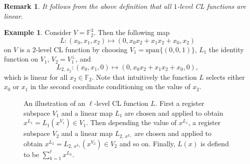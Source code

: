 \documentclass[11pt]{article}
\newtheorem{remark}[theorem]{Remark}
\theoremstyle{definition}
\newtheorem{example}[theorem]{Example}
\newcommand{\F}{\ensuremath{\mathbb{F}}}
\begin{document}
\begin{remark}
  \label{rk:level-1-is-linear}
  It follows from the above definition that all $1$-level CL functions are linear.
\end{remark}

\begin{example}\label{ex:cl-function}
Consider $V = \F_{2}^{3}$. Then the following map
\begin{equation*}
  L:(x_{0}, x_{1}, x_{2})
  \mapsto (0, x_{0}x_{2} + x_{1}x_{2} + x_{0},  x_{2})
\end{equation*}
on $V$ is a $2$-level CL function by choosing $V_{1} = \mathrm{span}\{(0,0,1)\}$, $L_{1}$
the identity function on $V_{1}$, $V_{2} = V_{1}^{\perp}$, and
\begin{equation*}
  L_{2,\, x_{2}}: (x_{0}, x_{1}, 0)
  \mapsto (0, x_{0}x_{2} + x_{1}x_{2} + x_{0}, 0),
\end{equation*}
which is linear for all $x_{2} \in \F_{2}$.
Note that intuitively the function $L$ selects either $x_{0}$ or $x_{1}$ in the
second coordinate conditioning on the value of $x_{2}$.
\end{example}

\begin{figure}[!htbp]
  \centering
  \caption{An illustration of an $\ell$-level CL function $L$.
    First a register subspace $V_{1}$ and a linear map $L_{1}$ are chosen and
    applied to obtain $x^{L_{1}} = L_{1}(x^{V_{1}}) \in V_{1}$.
    Then depending the value of $x^{L_{1}}$, a register subspace $V_{2}$ and a
    linear map $L_{2,\,x^{L_{1}}}$ are chosen and applied to obtain
    $x^{L_{2}} = L_{2,\,x^{{L_{1}}}}(x^{V_{2}}) \in V_{2}$ and so on.
    Finally, $L(x)$ is defiend to be
    $\sum_{k=1}^{\ell} x^{L_{k}}$.}\label{fig:cl-functions}
\end{figure}
\end{document}
